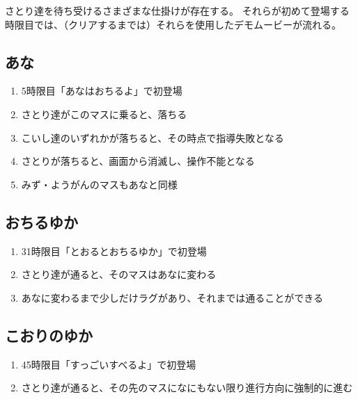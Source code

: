 \clearpage
さとり達を待ち受けるさまざまな仕掛けが存在する。
それらが初めて登場する時限目では、（クリアするまでは）それらを使用したデモムービーが流れる。


\subsection{あな}
\begin{enumerate}[label={\sarrow}]
\item 5時限目「あなはおちるよ」で初登場
\item さとり達がこのマスに乗ると、落ちる
\item こいし達のいずれかが落ちると、その時点で指導失敗となる
\item さとりが落ちると、画面から消滅し、操作不能となる
\item みず・ようがんのマスもあなと同様
\end{enumerate}


\subsection{おちるゆか}
\begin{enumerate}[label={\sarrow}]
\item 31時限目「とおるとおちるゆか」で初登場
\item さとり達が通ると、そのマスはあなに変わる
\item あなに変わるまで少しだけラグがあり、それまでは通ることができる
\end{enumerate}


\subsection{こおりのゆか}
\begin{enumerate}[label={\sarrow}]
\item 45時限目「すっごいすべるよ」で初登場
\item さとり達が通ると、その先のマスになにもない限り進行方向に強制的に進む
\end{enumerate}



